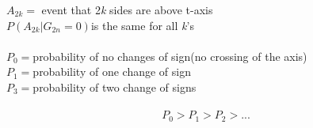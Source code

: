 $A_{2k} =$ event that 2{\it k} sides are above t-axis\\
$P(A_{2k}|G_{2n}=0)$is  the same for all {\it k}'s\\
\\
$P_0=$probability of no changes of sign(no crossing of the axis)\\
$P_1=$probability of one change of sign\\
$P_3=$probability of two change of signs\\
\\
\begin{displaymath}P_0>P_1>P_2>...\end{displaymath}






















